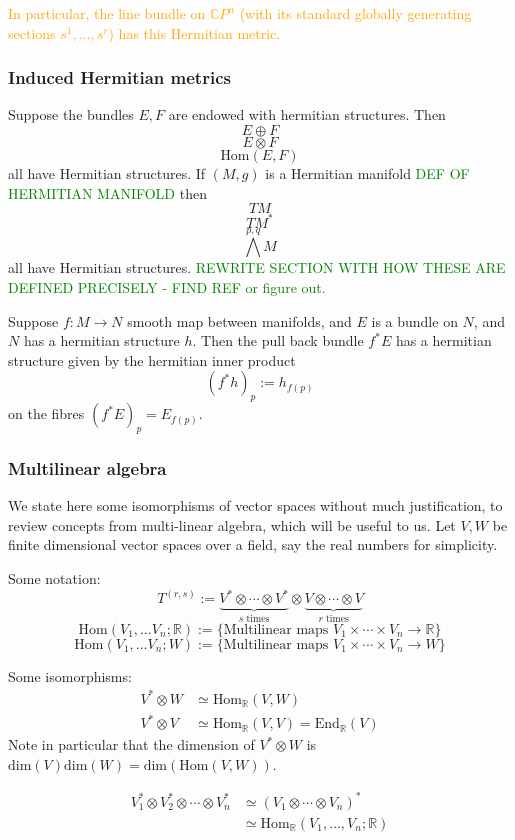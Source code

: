 \documentclass[a4paper]{article}
\theoremstyle{definition} \newtheorem*{definition}{Definition}
\theoremstyle{definition} \newtheorem*{definitions}{Definitions}
\theoremstyle{plain} \newtheorem{theorem}{Theorem}[section]
\theoremstyle{plain} \newtheorem{proposition}[theorem]{Proposition}
\theoremstyle{plain} \newtheorem{corollary}[theorem]{Corollary}
\theoremstyle{plain} \newtheorem{lemma}[theorem]{Lemma}
\theoremstyle{plain} \newtheorem{example}[theorem]{Example}
\newcommand{\understandBetter}[1]{\textcolor{orange}{#1}}
\newcommand{\finish}[1]{\textcolor{green}{#1}}
\newcommand{\realnos}{\mathbb{R}}
\newcommand{\complexnos}{\mathbb{C}}
\newcommand{\Hom}{\text{Hom}}
\begin{document}
\understandBetter{In particular, the line bundle on $\complexnos P^n$ (with its standard globally generating sections $s^1, \dots, s^r$) has this Hermitian metric.}

\subsubsection{Induced Hermitian metrics}
Suppose the bundles $E, F$ are endowed with hermitian structures. Then
$$E\oplus F$$
$$E\otimes F$$
$$\Hom(E, F)$$
all have Hermitian structures. If $(M, g)$ is a Hermitian manifold \finish{DEF OF HERMITIAN MANIFOLD} then
$$TM$$
$$TM^*$$
$$\bigwedge^{p,q} M$$
all have Hermitian structures.
\finish{REWRITE SECTION WITH HOW THESE ARE DEFINED PRECISELY - FIND REF or figure out.}

Suppose $f:M\to N$ smooth map between manifolds, and $E$ is a bundle on $N$, and $N$ has a hermitian structure $h$. Then the pull back bundle $f^*E$ has a hermitian structure given by the hermitian inner product
$$(f^*h)_p:=h_{f(p)}$$
on the fibres $(f^*E)_p=E_{f(p)}$.

\subsubsection{Multilinear algebra}
We state here some isomorphisms of vector spaces without much justification, to review concepts from multi-linear algebra, which will be useful to us. Let $V, W$ be finite dimensional vector spaces over a field, say the real numbers for simplicity. 

Some notation:
$$T^{(r,s)}:=\underbrace{V^*\otimes \cdots \otimes V^*}_{s \text{ times}} \otimes \underbrace{V \otimes \cdots \otimes V}_{r \text{ times}} $$
$$\Hom(V_1, \ldots V_n; \realnos):= \{\text{Multilinear maps } V_1\times \cdots \times V_n \to \realnos\}$$
$$\Hom(V_1, \ldots V_n; W):= \{\text{Multilinear maps } V_1\times \cdots \times V_n \to W\}$$

Some isomorphisms:
\begin{align*}
V^*\otimes W & \simeq \Hom_\realnos(V, W) \\
V^*\otimes V & \simeq \Hom_\realnos(V, V) = \text{End}_\realnos (V) 
\end{align*}
Note in particular that the dimension of $V^*\otimes W$ is $\text{dim}(V)\text{dim}(W)=\text{dim}(\Hom(V, W))$.

\begin{align*}
V_1^* \otimes V_2^* \otimes \cdots \otimes V_n^* & \simeq (V_1\otimes \cdots \otimes V_n)^* \\
& \simeq \Hom_\realnos (V_1, \ldots, V_n; \realnos) 
\end{align*}
\end{document}
